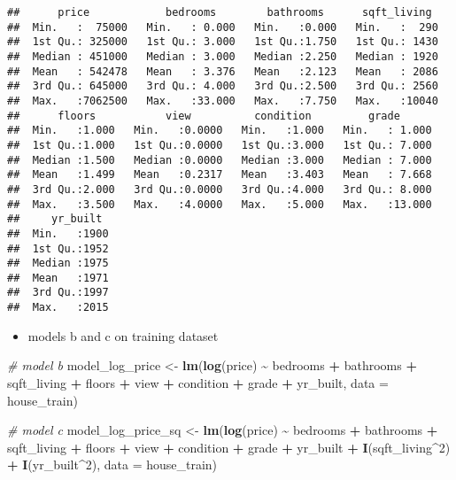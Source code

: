 \documentclass[
]{article}
\newenvironment{Shaded}{\begin{snugshade}}{\end{snugshade}}
\newcommand{\AttributeTok}[1]{\textcolor[rgb]{0.13,0.29,0.53}{#1}}
\newcommand{\CommentTok}[1]{\textcolor[rgb]{0.56,0.35,0.01}{\textit{#1}}}
\newcommand{\DecValTok}[1]{\textcolor[rgb]{0.00,0.00,0.81}{#1}}
\newcommand{\FunctionTok}[1]{\textcolor[rgb]{0.13,0.29,0.53}{\textbf{#1}}}
\newcommand{\NormalTok}[1]{#1}
\newcommand{\OtherTok}[1]{\textcolor[rgb]{0.56,0.35,0.01}{#1}}
\newcommand{\SpecialCharTok}[1]{\textcolor[rgb]{0.81,0.36,0.00}{\textbf{#1}}}
\providecommand{\tightlist}{%
  \setlength{\itemsep}{0pt}\setlength{\parskip}{0pt}}
\begin{document}
\begin{verbatim}
##      price            bedrooms        bathrooms      sqft_living   
##  Min.   :  75000   Min.   : 0.000   Min.   :0.000   Min.   :  290  
##  1st Qu.: 325000   1st Qu.: 3.000   1st Qu.:1.750   1st Qu.: 1430  
##  Median : 451000   Median : 3.000   Median :2.250   Median : 1920  
##  Mean   : 542478   Mean   : 3.376   Mean   :2.123   Mean   : 2086  
##  3rd Qu.: 645000   3rd Qu.: 4.000   3rd Qu.:2.500   3rd Qu.: 2560  
##  Max.   :7062500   Max.   :33.000   Max.   :7.750   Max.   :10040  
##      floors           view          condition         grade       
##  Min.   :1.000   Min.   :0.0000   Min.   :1.000   Min.   : 1.000  
##  1st Qu.:1.000   1st Qu.:0.0000   1st Qu.:3.000   1st Qu.: 7.000  
##  Median :1.500   Median :0.0000   Median :3.000   Median : 7.000  
##  Mean   :1.499   Mean   :0.2317   Mean   :3.403   Mean   : 7.668  
##  3rd Qu.:2.000   3rd Qu.:0.0000   3rd Qu.:4.000   3rd Qu.: 8.000  
##  Max.   :3.500   Max.   :4.0000   Max.   :5.000   Max.   :13.000  
##     yr_built   
##  Min.   :1900  
##  1st Qu.:1952  
##  Median :1975  
##  Mean   :1971  
##  3rd Qu.:1997  
##  Max.   :2015
\end{verbatim}

\begin{itemize}
\tightlist
\item
  models b and c on training dataset
\end{itemize}

\begin{Shaded}
\begin{Highlighting}[]
\CommentTok{\# model b}
\NormalTok{model\_log\_price }\OtherTok{\textless{}{-}} \FunctionTok{lm}\NormalTok{(}\FunctionTok{log}\NormalTok{(price) }\SpecialCharTok{\textasciitilde{}}\NormalTok{ bedrooms }\SpecialCharTok{+}\NormalTok{ bathrooms }\SpecialCharTok{+}\NormalTok{ sqft\_living }\SpecialCharTok{+}
\NormalTok{  floors }\SpecialCharTok{+}\NormalTok{ view }\SpecialCharTok{+}\NormalTok{ condition }\SpecialCharTok{+}\NormalTok{ grade }\SpecialCharTok{+}\NormalTok{ yr\_built,}
  \AttributeTok{data =}\NormalTok{ house\_train)}

\CommentTok{\# model c}
\NormalTok{model\_log\_price\_sq }\OtherTok{\textless{}{-}} \FunctionTok{lm}\NormalTok{(}\FunctionTok{log}\NormalTok{(price) }\SpecialCharTok{\textasciitilde{}}\NormalTok{ bedrooms }\SpecialCharTok{+}\NormalTok{ bathrooms }\SpecialCharTok{+}\NormalTok{ sqft\_living  }\SpecialCharTok{+}
\NormalTok{  floors }\SpecialCharTok{+}\NormalTok{ view }\SpecialCharTok{+}\NormalTok{ condition }\SpecialCharTok{+}\NormalTok{ grade }\SpecialCharTok{+}\NormalTok{ yr\_built }\SpecialCharTok{+} \FunctionTok{I}\NormalTok{(sqft\_living}\SpecialCharTok{\^{}}\DecValTok{2}\NormalTok{) }\SpecialCharTok{+} \FunctionTok{I}\NormalTok{(yr\_built}\SpecialCharTok{\^{}}\DecValTok{2}\NormalTok{),}
  \AttributeTok{data =}\NormalTok{ house\_train)}
\end{Highlighting}
\end{Shaded}
\end{document}
